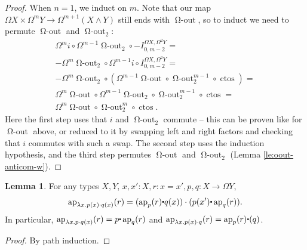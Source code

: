 \documentclass{amsart}
\theoremstyle{definition}
\newtheorem{lem}[theorem]{Lemma}
\newcommand{\ap}{\operatorname{ap}}
\newcommand{\oout}{\operatorname{\Omega-out}}
\newcommand{\ctos}{\operatorname{ctos}}
\newcommand{\whisk}{\raisebox{0.5ex}{$\displaystyle\centerdot$}}
\newcommand{\ooutk}[1]{\operatorname{\Omega-out}^{#1}}
\begin{document}
\begin{proof}
    When $n=1$, we induct on $m$. Note that our map $\Omega X \times \Omega^m Y \to \Omega^{m+1}(X \wedge Y)$ still ends with $\oout$, so to induct we need to permute $\oout$ and $\oout_2$:
    \begin{align*}
        \Omega^mi \circ \Omega^{m-1} \oout_2 \circ -I_{0, m-2}^{\Omega X, \Omega^2Y} = \\
        -\Omega^m \oout_2 \circ \Omega^{m-1}i \circ I_{0, m-2}^{\Omega X, \Omega^2Y} = \\
        -\Omega^m \oout_2 \circ (\Omega^{m-1} \oout \circ \ooutk{m-1}_2 \circ \ctos) = \\
        \Omega^m \oout \circ \Omega^{m-1} \oout_2 \circ \ooutk{m-1}_2 \circ \ctos = \\
        \Omega^m \oout \circ  \ooutk{m}_2 \circ \ctos.
    \end{align*}
    Here the first step uses that $i$ and $\oout_2$ commute -- this can be proven like for $\oout$ above, or reduced to it by swapping left and right factors and checking that $i$ commutes with such a swap. The second step uses the induction hypothesis, and the third step permutes $\oout$ and $\oout_2$ (Lemma \ref{le:oout-anticom-w}).
\end{proof}



\begin{lem}\label{le:ap-composite}
    For any types $X, Y$, $x,x':X, r: x=x', p,q: X \to \Omega Y$,
    $$\ap_{\lambda x.p(x) \cdot q(x)}(r) = (\ap_{p}(r) \whisk q(x)) \cdot (p(x') \whisk \ap_{q}(r)). $$
    In particular, $\ap_{\lambda x.p \cdot q(x)}(r) = p \whisk \ap_q(r)$ and $\ap_{\lambda x.p(x) \cdot q}(r) = \ap_p(r) \whisk (q)$.
\end{lem}
\begin{proof}
    By path induction.
\end{proof}
\end{document}
